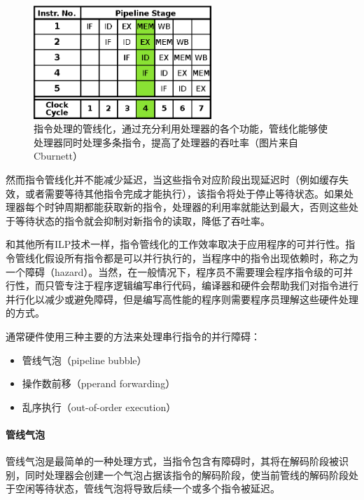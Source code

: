 \begin{figure}
	\sidecaption
	\includegraphics[width=0.6\textwidth]{figures/rp/5-Stage-Pipeline}
	\caption{指令处理的管线化，通过充分利用处理器的各个功能，管线化能够使处理器同时处理多条指令，提高了处理器的吞吐率（图片来自Cburnett）}
	\label{f:rp-5-Stage-Pipeline}
\end{figure}

然而指令管线化并不能减少延迟，当这些指令对应阶段出现延迟时（例如缓存失效，或者需要等待其他指令完成才能执行），该指令将处于停止等待状态。如果处理器每个时钟周期都能获取新的指令，处理器的利用率就能达到最大，否则这些处于等待状态的指令就会抑制对新指令的读取，降低了吞吐率。

和其他所有ILP技术一样，指令管线化的工作效率取决于应用程序的可并行性。指令管线化假设所有指令都是可以并行执行的，当程序中的指令出现依赖时，称之为一个障碍（hazard）。当然，在一般情况下，程序员不需要理会程序指令级的可并行性，而只管专注于程序逻辑编写串行代码，编译器和硬件会帮助我们对指令进行并行化以减少或避免障碍，但是编写高性能的程序则需要程序员理解这些硬件处理的方式。

通常硬件使用三种主要的方法来处理串行指令的并行障碍：

\begin{itemize}
	\item 管线气泡（pipeline bubble）
	\item 操作数前移（pperand forwarding）
	\item 乱序执行（out-of-order execution）
\end{itemize}




\paragraph{管线气泡}
管线气泡是最简单的一种处理方式，当指令包含有障碍时，其将在解码阶段被识别，同时处理器会创建一个气泡占据该指令的解码阶段，使当前管线的解码阶段处于空闲等待状态，管线气泡将导致后续一个或多个指令被延迟。

